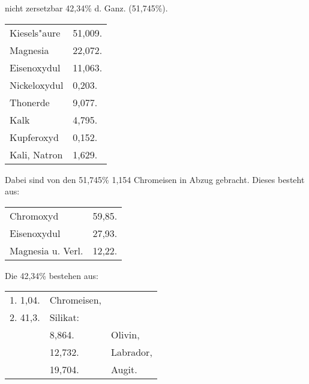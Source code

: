 \documentclass[a4paper, 11pt, oneside]{article}
\begin{document}
\begin{center}
nicht zersetzbar 42,34\% d. Ganz. (51,745\%).
\end{center}

\begin{table}[H]
    \centering\swabfamily\Large
    \begin{tabular}{l l}
        \hline
        Kiesels"aure & 51,009. \\
        Magnesia & 22,072. \\
        Eisenoxydul & 11,063. \\
        Nickeloxydul & 0,203. \\
        Thonerde & 9,077. \\
        Kalk & 4,795. \\
        Kupferoxyd & 0,152. \\
        Kali, Natron & 1,629. \\
    \end{tabular}
\end{table}

\begin{center}
Dabei sind von den 51,745\% 1,154 Chromeisen in Abzug gebracht. Dieses besteht aus:
\end{center}

\begin{table}[H]
    \centering\swabfamily\Large
    \begin{tabular}{l l}
        Chromoxyd & 59,85. \\
        Eisenoxydul & 27,93. \\
        Magnesia u. Verl. & 12,22. \\
    \end{tabular}
\end{table}

\begin{center}
Die 42,34\% bestehen aus:
\end{center}

\begin{table}[H]
    \centering\swabfamily\Large
    \begin{tabular}{l l l}
        1. 1,04. & Chromeisen, & \\
        2. 41,3. & Silikat: & \\
         & 8,864. & Olivin, \\
         & 12,732. & Labrador, \\
         & 19,704. & Augit. \\
    \end{tabular}
\end{table}
\end{document}
